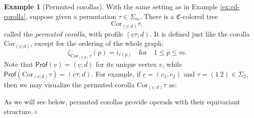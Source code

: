 \documentclass{amsbook}
\numberwithin{section}{chapter}
\numberwithin{subsection}{section}
\numberwithin{equation}{section}
\theoremstyle{plain}
\theoremstyle{definition}
\newtheorem{example}[equation]{Example}
\newcommand{\colorc}{\mathfrak{C}}
\newcommand{\Cor}{\mathrm{Cor}}
\newcommand{\Prof}{\mathsf{Prof}}
\newcommand{\profofv}{\Prof(v)}
\newcommand{\dqed}{\hfill$\diamond$}
\newcommand{\uc}{\underline c}
\newcommand{\forspace}{\quad\text{for}\quad}
\begin{document}
\begin{example}[Permuted corollas]\label{ex:cd-permuted-corolla}
With the same setting as in Example \ref{ex:cd-corolla}, suppose given a permutation $\tau \in \Sigma_m$.  There is a $\colorc$-colored tree \[\Cor_{(\uc;d)}\tau,\] called the \emph{permuted corolla}\label{notation:permuted-corolla}, with profile $(\uc\tau;d)$.  It is defined just like the corolla $\Cor_{(\uc;d)}$, except for the ordering of the whole graph:
\[\zeta_{\Cor_{(\uc;d)}\tau}(p) = i_{\tau(p)} \forspace 1 \leq p \leq m.\]
Note that $\profofv = (\uc;d)$ for its unique vertex $v$, while $\Prof(\Cor_{(\uc;d)}\tau)=(\uc\tau;d)$.  For example, if $\uc = (c_1,c_2)$ and $\tau = (1~2) \in \Sigma_2$, then we may visualize the permuted corolla $\Cor_{(\uc;d)}\tau$ as:
\begin{center}\end{center}
As we will see below, permuted corollas provide operads with their equivariant structure.\dqed \end{example}
\end{document}
